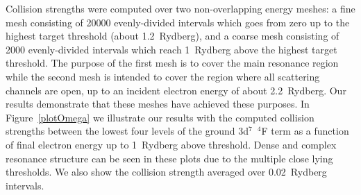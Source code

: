 \documentclass[useAMS,usenatbib]{mn2e}
\begin{document}
Collision strengths were computed over two non-overlapping energy meshes: a fine mesh consisting of
20000 evenly-divided intervals which goes from zero up to the highest target threshold (about
1.2~Rydberg), and a coarse mesh consisting of 2000 evenly-divided intervals which reach 1~Rydberg
above the highest target threshold. The purpose of the first mesh is to cover the main resonance
region while the second mesh is intended to cover the region where all scattering channels are
open, up to an incident electron energy of about 2.2~Rydberg. Our results demonstrate that these
meshes have achieved these purposes. In Figure~\ref{plotOmega} we illustrate our results with the
computed collision strengths between the lowest four levels of the ground 3d$^7$~$^4$F term as a
function of final electron energy up to 1~Rydberg above threshold. Dense and complex resonance
structure can be seen in these plots due to the multiple close lying thresholds. We also show the
collision strength averaged over 0.02~Rydberg intervals.
\end{document}
